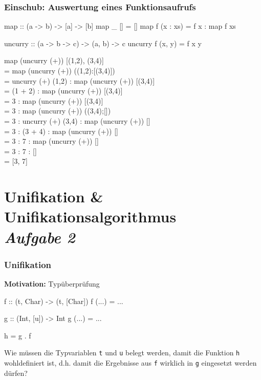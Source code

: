 \documentclass{beamer}
\begin{document}
{
\color{cdgray}
\begin{frame}[fragile, t] \frametitle{Einschub: Auswertung eines Funktionsaufrufs}
	\begin{codebox}
map :: (a -> b) -> [a] -> [b]
map _ []       = []
map f (x : xs) = f x : map f xs

uncurry :: (a -> b -> c) -> (a, b) -> c
uncurry f (x, y) = f x y
	\end{codebox}
	
	\footnotesize
	\begin{ttfamily}
		map (uncurry (+)) [(1,2), (3,4)] \\ \pause
		= map (uncurry (+)) ((1,2):[(3,4)]) \\
		= uncurry (+) (1,2) : map (uncurry (+)) [(3,4)] \\
		= (1 + 2) : map (uncurry (+)) [(3,4)] \\
		= 3 : map (uncurry (+)) [(3,4)] \\
		= 3 : map (uncurry (+)) ((3,4);[]) \\
		= 3 : uncurry (+) (3,4) : map (uncurry (+)) [] \\
		= 3 : (3 + 4) : map (uncurry (+)) [] \\
		= 3 : 7 : map (uncurry (+)) [] \\
		= 3 : 7 : [] \\
		= [3, 7]
	\end{ttfamily}

\end{frame}
}



\section{Unifikation \& Unifikationsalgorithmus \\ \textit{\normalsize Aufgabe 2}}


\begin{frame}[fragile] \frametitle{Unifikation}
	\footnotesize
	\textbf{Motivation:} Typüberprüfung
		 
	\begin{codebox}
f :: (t, Char) -> (t, [Char])
f (...) = ... 

g :: (Int, [u]) -> Int
g (...) = ...

h = g . f
	\end{codebox}
	
	\pause
	
	Wie müssen die Typvariablen \texttt{t} und \texttt{u} belegt werden, damit die Funktion \texttt{h} wohldefiniert ist, d.h. damit die Ergebnisse aus \texttt{f} wirklich in \texttt{g} eingesetzt werden dürfen?
\end{frame}
\end{document}
